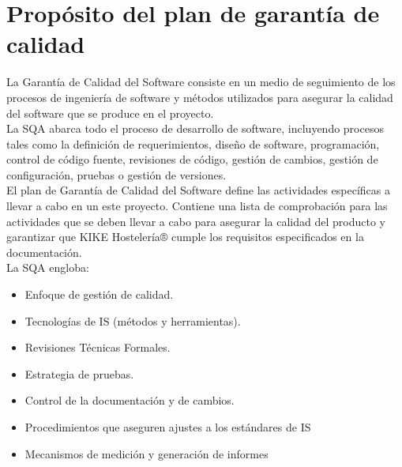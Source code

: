 \documentclass[spanish,a4paper,11pt, twoside]{report}	%
\begin{document}
\newpage
\mbox{}
\thispagestyle{empty}						%
\newpage


\tableofcontents 							%

\newpage
\mbox{}
\thispagestyle{empty}						%
\newpage



\chapter{ Propósito del plan de garantía de calidad}


 La Garantía de Calidad del Software consiste en un medio de seguimiento de los procesos de ingeniería de software y métodos utilizados para asegurar la calidad del software que se produce en el proyecto.\\

La SQA abarca todo el proceso de desarrollo de software, incluyendo procesos tales como la definición de requerimientos, diseño de software, programación, control de código fuente, revisiones de código, gestión de cambios, gestión de configuración, pruebas o gestión de versiones.\\

El plan de Garantía de Calidad del Software define las actividades específicas a llevar a cabo en un este proyecto. Contiene una lista de comprobación para las actividades que se deben llevar a cabo para asegurar la calidad del producto y garantizar que KIKE Hostelería® cumple los requisitos especificados en la documentación.\\
La SQA engloba:

\begin{itemize}
	\item Enfoque de gestión de calidad.
	\item Tecnologías de IS (métodos y herramientas).
	\item Revisiones Técnicas Formales.
	\item Estrategia de pruebas.
	\item Control de la documentación y de cambios.
	\item Procedimientos que aseguren ajustes a los estándares de IS
	\item Mecanismos de medición y generación de informes
\end{itemize}	
\end{document}
